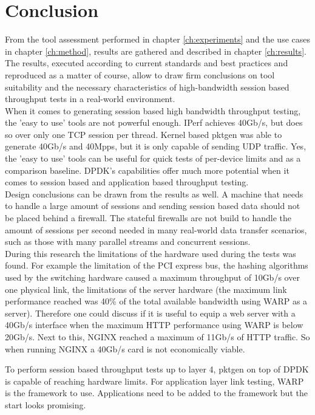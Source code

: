 \chapter{Conclusion}\label{ch:conclusion}
From the tool assessment performed in chapter \ref{ch:experiments} and the use cases in chapter \ref{ch:method}, results are gathered and described in chapter \ref{ch:results}.
The results, executed according to current standards and best practices and reproduced as a matter of course, allow to draw firm conclusions on tool suitability and the necessary characteristics of high-bandwidth session based throughput tests in a real-world environment. \\
When it comes to generating session based high bandwidth throughput testing, the 'easy to use' tools are not powerful enough. IPerf achieves 40Gb/s, but does so over only one TCP session per thread. 
Kernel based pktgen was able to generate 40Gb/s and 40Mpps, but it is only capable of sending UDP traffic. 
Yes, the 'easy to use' tools can be useful for quick tests of per-device limits and as a comparison baseline.
DPDK's capabilities offer much more potential when it comes to session based and application based throughput testing. \\ 

Design conclusions can be drawn from the results as well. A machine that needs to handle a large amount of sessions and sending session based data should not be placed behind a firewall.
The stateful firewalls are not build to handle the amount of sessions per second needed in many real-world data transfer scenarios, such as those with many parallel streams and concurrent sessions. \\ 

During this research the limitations of the hardware used during the tests was found. For example the limitation of the PCI express bus, the hashing algorithms used by the switching hardware caused a maximum throughput of 10Gb/s over one physical link, the limitations of the server hardware (the maximum link performance reached was 40\% of the total available bandwidth using WARP as a server). Therefore one could discuss if it is useful to equip a web server with a 40Gb/s interface when the maximum HTTP performance using WARP is below 20Gb/s.
Next to this, NGINX reached a maximum of 11Gb/s of HTTP traffic. So when running NGINX a 40Gb/s card is not economically viable. 

To perform session based throughput tests up to layer 4, pktgen on top of DPDK is capable of reaching hardware limits.
For application layer link testing, WARP is the framework to use. Applications need to be added to the framework but the start looks promising.

